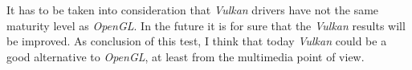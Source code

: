 It has to be taken into consideration that \emph{Vulkan} drivers have not the same maturity level as \emph{OpenGL}. In
the future it is for sure that the \emph{Vulkan} results will be improved. As conclusion of this test, I think that
today \emph{Vulkan} could be a good alternative to \emph{OpenGL}, at least from the multimedia point of view.
